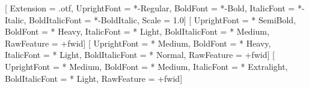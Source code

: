\setmainfont{LibertinusSerif}[%
  Extension      = .otf,
  UprightFont    = *-Regular,
  BoldFont       = *-Bold,
  ItalicFont     = *-Italic,
  BoldItalicFont = *-BoldItalic,
  Scale          = 1.0]
[ %
  UprightFont     = * SemiBold,
  BoldFont        = * Heavy,
  ItalicFont      = * Light,
  BoldItalicFont  = * Medium,
  RawFeature      = +fwid]
[ %
  UprightFont     = * Medium,
  BoldFont        = * Heavy,
  ItalicFont      = * Light,
  BoldItalicFont  = * Normal,
  RawFeature      = +fwid]  
[%
  UprightFont     = * Medium,
  BoldFont        = * Medium,
  ItalicFont      = * Extralight,
  BoldItalicFont  = * Light,
  RawFeature      = +fwid]   

\newcommand{\nwafu}{西北农林科技大学}
\newcommand{\cie}{信息工程学院}
\newcommand{\ca}{农学院}
\newcommand{\cpp}{植物保护学院}
\newcommand{\ch}{园艺学院}
\newcommand{\cast}{动物科技学院}
\newcommand{\cvm}{动物医学院}
\newcommand{\cf}{林学院}
\newcommand{\claa}{风景园林艺术学院}
\newcommand{\cnre}{资源环境学院}
\newcommand{\cwrae}{水利与建筑工程学院}
\newcommand{\cmee}{机械与电子工程学院}
\newcommand{\cfse}{食品科学与工程学院}
\newcommand{\ce}{葡萄酒学院}
\newcommand{\cls}{生命科学学院}
\newcommand{\cs}{理学院}
\newcommand{\ccp}{化学与药学院}
\newcommand{\cem}{经济管理学院}
\newcommand{\cm}{马克思主义学院}
\newcommand{\dfl}{外语系}
\newcommand{\iec}{创新实验学院}
\newcommand{\ci}{国际学院}
\newcommand{\dpe}{体育部}
\newcommand{\cvae}{成人教育}
\newcommand{\iswc}{水土保持研究所}

\newcommand{\tomonth}{
  \the\year 年\the\month 月
}


\newcommand{\tomonthen}{
  \ifcase\the\month
  \or January%
  \or February%
  \or March%
  \or April%
  \or May%
  \or June%
  \or July%
  \or August%
  \or September%
  \or October%
  \or November%
  \or December%
  \fi, \the\year
}

\newcommand{\tosemester}{
  \the\year 年\ 
  \ifcase\the\month
  \or 秋%
  \or 春%
  \or 春%
  \or 春%
  \or 春%
  \or 春%
  \or 春%
  \or 夏%
  \or 秋%
  \or 秋%
  \or 秋%
  \or 秋%
  \fi 
}


